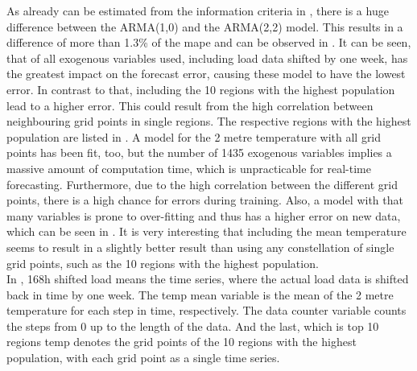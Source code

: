 As already can be estimated from the information criteria in , there is a huge difference between the ARMA(1,0) and the ARMA(2,2) model. This results in a difference of more than 1.3\% of the \gls{mape} and can be observed in . It can be seen, that of all exogenous variables used, including load data shifted by one week, has the greatest impact on the forecast error, causing these model to have the lowest error. In contrast to that, including the 10 regions with the highest population lead to a higher error. This could result from the high correlation between neighbouring grid points in single regions. The respective regions with the highest population are listed in . A model for the 2 metre temperature with all grid points has been fit, too, but the number of 1435 exogenous variables implies a massive amount of computation time, which is unpracticable for real-time forecasting. Furthermore, due to the high correlation between the different grid points, there is a high chance for errors during training. Also, a model with that many variables is prone to over-fitting and thus has a higher error on new data, which can be seen in . It is very interesting that including the mean temperature seems to result in a slightly better result than using any constellation of single grid points, such as \eg the 10 regions with the highest population.\\

In , 168h shifted load means the time series, where the actual load data is shifted back in time by one week. The temp mean variable is the mean of the 2 metre temperature for each step in time, respectively. The data counter variable counts the steps from 0 up to the length of the data. And the last, which is top 10 regions temp denotes the grid points of the 10 regions with the highest population, with each grid point as a single time series.\\

